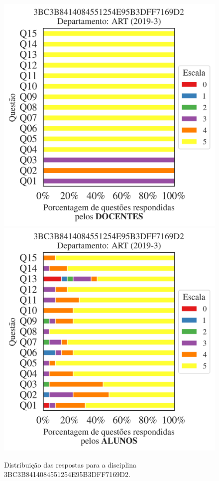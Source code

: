\documentclass[a4paper,10pt]{article}
\begin{document}
\begin{figure}[h]
\centering
\includegraphics[width=0.485\linewidth]{analise_disciplina_departamento_ART_3BC3B8414084551254E95B3DFF7169D2_docentes.png}
\includegraphics[width=0.485\linewidth]{analise_disciplina_departamento_ART_3BC3B8414084551254E95B3DFF7169D2_alunos.png}
\caption{\label{fig:analise_geral_departamento}                Distribuição das respostas para a disciplina 3BC3B8414084551254E95B3DFF7169D2. }
\end{figure}
\end{document}
